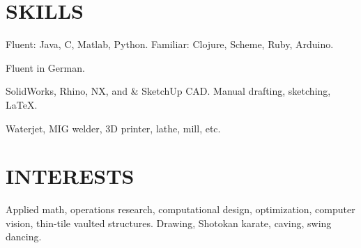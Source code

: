 \documentclass[margin]{res}
\begin{document}
\begin{resume}
\section{SKILLS} 
\begin{description} \itemsep -2pt
    \item[Programming:] Fluent: Java, C, Matlab, Python. Familiar: Clojure, Scheme, Ruby, Arduino.
    \item[Linguistic:] Fluent in German.
    \item[Design:] SolidWorks, Rhino, NX, and \& SketchUp CAD. Manual drafting, sketching, \LaTeX.
    \item[Machine Shop:] Waterjet, MIG welder, 3D printer, lathe, mill, etc.
\end{description}


\section{INTERESTS}
Applied math, operations research, computational design, optimization, computer vision, thin-tile vaulted structures. Drawing, Shotokan karate, caving, swing dancing.
\end{resume}
\end{document}
